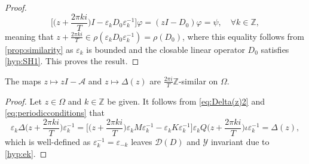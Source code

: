 \documentclass[english]{myarticle}
\begin{document}
\begin{sloppypar}
\begin{proof}
\begin{equation*}
    \bigg[\bigg( z + \frac{2 \pi k i}{T}\bigg) I - \varepsilon_k D_0 \varepsilon_{k}^{-1} \bigg] \varphi = (zI-D_0)\varphi = \psi, \quad \forall k \in \mathbb{Z},
\end{equation*}
meaning that $z + \frac{2 \pi k i}{T} \in \rho(\varepsilon_k D_0 \varepsilon_{k}^{-1}) = \rho(D_0)$, where this equality follows from \cref{prop:similarity} as $\varepsilon_k$ is bounded and the closable linear operator $D_0$ satisfies \ref{hyp:SH1}. This proves the result.
\end{proof}
\begin{proposition} \label{prop:Deltasimilar}
The maps $z \mapsto zI - \mathcal{A}$ and $z \mapsto \Delta(z)$ are $\frac{2 \pi i}{T}\mathbb{Z}$-similar on $\Omega$.
\end{proposition}
\begin{proof}
Let $z \in \Omega$ and $k \in \mathbb{Z}$ be given. It follows from \eqref{eq:Delta(z)2} and \eqref{eq:periodicconditions} that
\begin{equation*}
    \varepsilon_k \Delta \bigg(z + \frac{2 \pi k i}{T} \bigg) \varepsilon_k^{-1} = \bigg[ \bigg( z + \frac{2 \pi k i}{T}\bigg)\varepsilon_k M \varepsilon_k^{-1} - \varepsilon_k K \varepsilon_k^{-1} \bigg] \varepsilon_k Q\bigg(z + \frac{2 \pi k i}{T}\bigg) \iota \varepsilon_k^{-1} = \Delta(z),
\end{equation*}
which is well-defined as $\varepsilon_{k}^{-1} = \varepsilon_{-k}$ leaves $\mathcal{D}(D)$ and $\mathcal{Y}$ invariant due to \ref{hyp:ek}.


\end{proof}
\end{sloppypar}
\end{document}
